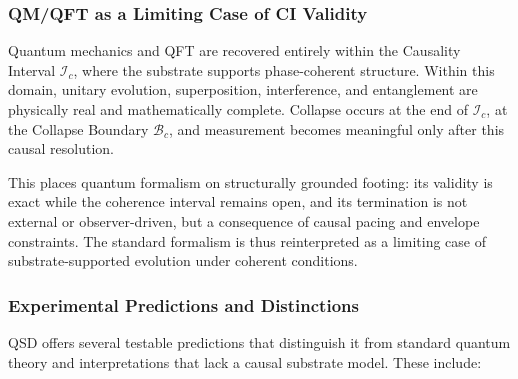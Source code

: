 \documentclass[entropy,article,submit,pdftex,moreauthors]{Definitions/mdpi}
\begin{document}
\subsubsection{QM/QFT as a Limiting Case of CI Validity}

Quantum mechanics and QFT are recovered entirely within the Causality Interval \( \mathcal{I}_c \), where the substrate supports phase-coherent structure. Within this domain, unitary evolution, superposition, interference, and entanglement are physically real and mathematically complete. Collapse occurs at the end of \( \mathcal{I}_c \), at the Collapse Boundary \( \mathcal{B}_c \), and measurement becomes meaningful only after this causal resolution.

This places quantum formalism on structurally grounded footing: its validity is exact while the coherence interval remains open, and its termination is not external or observer-driven, but a consequence of causal pacing and envelope constraints. The standard formalism is thus reinterpreted as a limiting case of substrate-supported evolution under coherent conditions.

\subsubsection{Experimental Predictions and Distinctions}

QSD offers several testable predictions that distinguish it from standard quantum theory and interpretations that lack a causal substrate model. These include:
\end{document}
